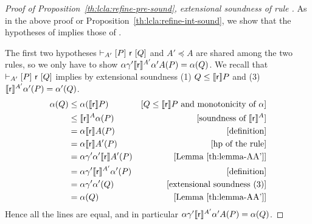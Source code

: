 \begin{proof}[Proof of Proposition~\ref{th:lcla:refine-pre-sound}, extensional soundness of rule ]
	As in the above proof or Proposition~\ref{th:lcla:refine-int-sound}, we show that the hypotheses of  implies those of .

	The first two hypotheses $\vdash_{A'}\nobreak[P]~\mathsf{r}~[Q]$ and $A' \preceq A$ are shared among the two rules, so we only have to show $\alpha \gamma' \llbracket\mathsf{r}\rrbracket^{A'} \alpha' A(P) = \alpha(Q)$. We recall that $\vdash_{A'}\nobreak[P]~\mathsf{r}~[Q]$ implies by extensional soundness (1) $Q \le \llbracket\mathsf{r}\rrbracket P$ and (3) $\llbracket\mathsf{r}\rrbracket^{A'} \alpha'(P) = \alpha'(Q)$.
	\begin{align*}
		\alpha(Q) & \le \alpha(\llbracket\mathsf{r}\rrbracket P )                   & [Q \le \llbracket\mathsf{r}\rrbracket P \text{ and monotonicity of }\alpha] \\
		          & \le \llbracket\mathsf{r}\rrbracket^{A} \alpha(P)                & [\text{soundness of }\llbracket\mathsf{r}\rrbracket^{A}]                    \\
		          & = \alpha \llbracket\mathsf{r}\rrbracket A(P)                    & [\text{definition}]                                        \\
		          & = \alpha \llbracket\mathsf{r}\rrbracket A'(P)                   & [\text{hp of the rule}]                                    \\
		          & = \alpha \gamma' \alpha' \llbracket\mathsf{r}\rrbracket A'(P)   & [\text{Lemma~\ref{th:lemma-AA'}}]                          \\
		          & = \alpha \gamma' \llbracket\mathsf{r}\rrbracket^{A'} \alpha'(P) & [\text{definition}]                                        \\
		          & = \alpha \gamma' \alpha'(Q)                    & [\text{extensional soundness (3)}]                         \\
		          & = \alpha(Q)                                    & [\text{Lemma~\ref{th:lemma-AA'}}]
	\end{align*}
	Hence all the lines are equal, and in particular $\alpha \gamma' \llbracket\mathsf{r}\rrbracket^{A'} \alpha' A(P) = \alpha(Q)$.
\end{proof}

